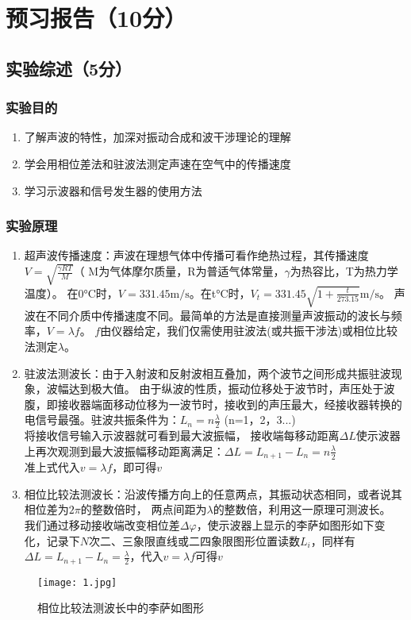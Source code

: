 \documentclass{../template/Report}
\begin{document}
\makecover

\section{预习报告（10分）}
\subsection{实验综述（5分）}
\subsubsection{实验目的}
\begin{enumerate}
	\item 了解声波的特性，加深对振动合成和波干涉理论的理解
	\item 学会用相位差法和驻波法测定声速在空气中的传播速度
	\item 学习示波器和信号发生器的使用方法
\end{enumerate}
\subsubsection{实验原理}
\begin{enumerate}
	\item 超声波传播速度：声波在理想气体中传播可看作绝热过程，其传播速度$V=\sqrt{\frac{\gamma RT}{M}}$（
	      M为气体摩尔质量，R为普适气体常量，$\gamma$为热容比，T为热力学温度）。
	      在0$\si{\degreeCelsius}$时，$V=331.45\si{\metre\per\second}$。在t$\si{\degreeCelsius}$时，$V_t = 331.45\sqrt{1+\frac{t}{273.15}}\si{\metre\per\second}$。
	      声波在不同介质中传播速度不同。最简单的方法是直接测量声波振动的波长与频率，$V=\lambda f$。
	      $f$由仪器给定，我们仅需使用驻波法(或共振干涉法)或相位比较法测定$\lambda$。
	\item 驻波法测波长：由于入射波和反射波相互叠加，两个波节之间形成共振驻波现象，波幅达到极大值。
	      由于纵波的性质，振动位移处于波节时，声压处于波腹，即接收器端面移动位移为一波节时，接收到的声压最大，经接收器转换的电信号最强。驻波共振条件为：$L_n = n\frac{\lambda}{2}$ (n=1，2，3...)\\
	      将接收信号输入示波器就可看到最大波振幅，
	      接收端每移动距离$\Delta L$使示波器上再次观测到最大波振幅移动距离满足：$\Delta L = L_{n+1} - L_n = n\frac{\lambda}{2}$\\
	      准上式代入$v=\lambda f$，即可得$v$
	\item 相位比较法测波长：沿波传播方向上的任意两点，其振动状态相同，或者说其相位差为$2\pi$的整数倍时，
	      两点间距为$\lambda$的整数倍，利用这一原理可测波长。
	      我们通过移动接收端改变相位差$\Delta\varphi$，使示波器上显示的李萨如图形如下变化，记录下$N$次二、三象限直线或二四象限图形位置读数$L_i$，同样有$\Delta L = L_{n+1} - L_n = \frac{\lambda}{2}$，代入$v=\lambda f$可得$v$
\end{enumerate}
\begin{figure}[H]
	\centering
	\texttt{[image: 1.jpg]}
	\caption{相位比较法测波长中的李萨如图形}
\end{figure}
\end{document}
